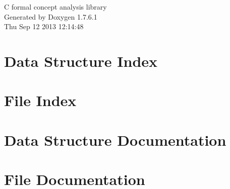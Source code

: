 \documentclass[a4paper]{book}
\begin{document}
\hypersetup{pageanchor=false,citecolor=blue}
\begin{titlepage}
\vspace*{7cm}
\begin{center}
{\Large \-C formal concept analysis library }\\
\vspace*{1cm}
{\large \-Generated by Doxygen 1.7.6.1}\\
\vspace*{0.5cm}
{\small Thu Sep 12 2013 12:14:48}\\
\end{center}
\end{titlepage}
\clearemptydoublepage
{}
\tableofcontents
\clearemptydoublepage
{}
\hypersetup{pageanchor=true,citecolor=blue}
\chapter{\-Data \-Structure \-Index}

\chapter{\-File \-Index}

\chapter{\-Data \-Structure \-Documentation}














\chapter{\-File \-Documentation}





















\printindex
\end{document}
